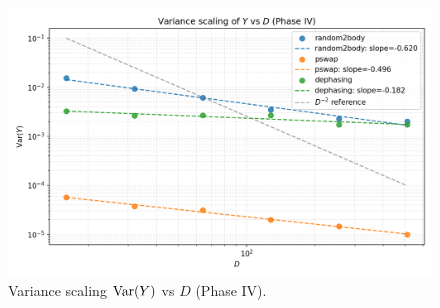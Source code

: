 \documentclass[11pt]{article}
\begin{document}
\begin{figure}[h]
\centering
\includegraphics[width=0.7\linewidth]{../figures/phase4_varY_scaling.png}
\caption{Variance scaling $\mathrm{Var}(Y)$ vs $D$ (Phase IV).}
\label{fig:phase4-vary}
\end{figure}




\clearpage

\end{document}
